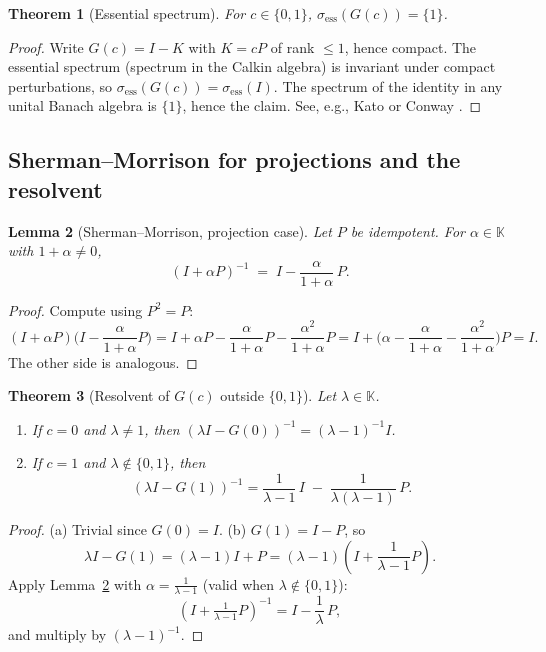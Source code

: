 \documentclass[11pt]{article}
\newtheorem{theorem}{Theorem}[section]
\newtheorem{lemma}[theorem]{Lemma}
\theoremstyle{definition}
\newcommand{\K}{\mathbb{K}}
\begin{document}
\begin{theorem}[Essential spectrum]\label{thm:ess-human}
For $c\in\{0,1\}$, $\sigma_{\mathrm{ess}}(G(c))=\{1\}$.
\end{theorem}

\begin{proof}
Write $G(c)=I-K$ with $K=cP$ of rank $\le 1$, hence compact. The essential spectrum (spectrum in the Calkin algebra) is invariant under compact perturbations, so $\sigma_{\mathrm{ess}}(G(c))=\sigma_{\mathrm{ess}}(I)$. The spectrum of the identity in any unital Banach algebra is $\{1\}$, hence the claim. See, e.g., Kato \cite[Sec.~IV.5]{Kato} or Conway \cite[III.6]{Conway}.
\end{proof}

\subsection{Sherman--Morrison for projections and the resolvent}

\begin{lemma}[Sherman--Morrison, projection case]\label{lem:SM-human}
Let $P$ be idempotent. For $\alpha\in\K$ with $1+\alpha\neq 0$,
\[
(I+\alpha P)^{-1} \;=\; I - \frac{\alpha}{1+\alpha}\,P.
\]
\end{lemma}

\begin{proof}
Compute using $P^2=P$:
\[
(I+\alpha P)\Big(I-\frac{\alpha}{1+\alpha}P\Big)
= I + \alpha P - \frac{\alpha}{1+\alpha}P - \frac{\alpha^2}{1+\alpha}P
= I + \Big(\alpha - \frac{\alpha}{1+\alpha} - \frac{\alpha^2}{1+\alpha}\Big)P
= I.
\]
The other side is analogous.
\end{proof}

\begin{theorem}[Resolvent of $G(c)$ outside $\{0,1\}$]\label{thm:resolvent-human}
Let $\lambda\in\K$.
\begin{enumerate}
\item If $c=0$ and $\lambda\neq 1$, then $(\lambda I - G(0))^{-1}=(\lambda-1)^{-1} I$.
\item If $c=1$ and $\lambda\notin\{0,1\}$, then
\[
(\lambda I - G(1))^{-1}
= \frac{1}{\lambda-1}\,I \;-\; \frac{1}{\lambda(\lambda-1)}\,P.
\]
\end{enumerate}
\end{theorem}

\begin{proof}
(a) Trivial since $G(0)=I$. (b) $G(1)=I-P$, so
\[
\lambda I - G(1)=(\lambda-1)I+P=(\lambda-1)\!\left(I+\frac{1}{\lambda-1}P\right).
\]
Apply Lemma~\ref{lem:SM-human} with $\alpha=\frac{1}{\lambda-1}$ (valid when $\lambda\notin\{0,1\}$):
\[
\left(I+\tfrac{1}{\lambda-1}P\right)^{-1}
= I - \frac{1}{\lambda}\,P,
\]
and multiply by $(\lambda-1)^{-1}$.
\end{proof}
\end{document}
